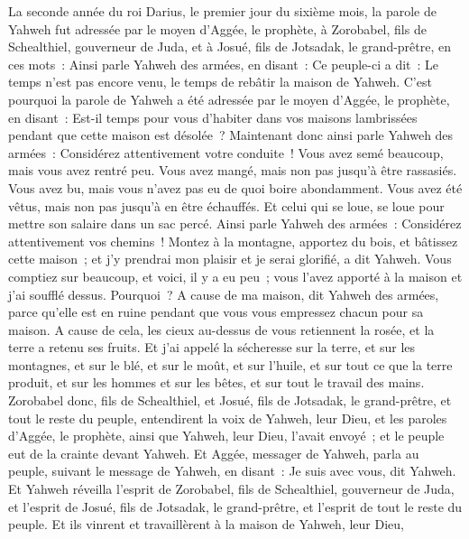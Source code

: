 \begin{multicols}{2}
\VerseOne{}La seconde année du roi Darius, le premier jour du sixième mois, la parole de Yahweh fut adressée par le moyen d'Aggée, le prophète, à Zorobabel, fils de Schealthiel, gouverneur de Juda, et à Josué, fils de Jotsadak, le grand-prêtre, en ces mots~:
Ainsi parle Yahweh des armées, en disant~: Ce peuple-ci a dit~: Le temps n'est pas encore venu, le temps de rebâtir la maison de Yahweh.
C'est pourquoi la parole de Yahweh a été adressée par le moyen d'Aggée, le prophète, en disant~:
Est-il temps pour vous d'habiter dans vos maisons lambrissées pendant que cette maison est désolée~?
Maintenant donc ainsi parle Yahweh des armées~: Considérez attentivement votre conduite~!
Vous avez semé beaucoup, mais vous avez rentré peu. Vous avez mangé, mais non pas jusqu'à être rassasiés. Vous avez bu, mais vous n'avez pas eu de quoi boire abondamment. Vous avez été vêtus, mais non pas jusqu'à en être échauffés. Et celui qui se loue, se loue pour mettre son salaire dans un sac percé.
Ainsi parle Yahweh des armées~: Considérez attentivement vos chemins~!
Montez à la montagne, apportez du bois, et bâtissez cette maison~; et j'y prendrai mon plaisir et je serai glorifié, a dit Yahweh.
Vous comptiez sur beaucoup, et voici, il y a eu peu~; vous l'avez apporté à la maison et j'ai soufflé dessus. Pourquoi~? A cause de ma maison, dit Yahweh des armées, parce qu'elle est en ruine pendant que vous vous empressez chacun pour sa maison.
A cause de cela, les cieux au-dessus de vous retiennent la rosée, et la terre a retenu ses fruits.
Et j'ai appelé la sécheresse sur la terre, et sur les montagnes, et sur le blé, et sur le moût, et sur l'huile, et sur tout ce que la terre produit, et sur les hommes et sur les bêtes, et sur tout le travail des mains.
Zorobabel donc, fils de Schealthiel, et Josué, fils de Jotsadak, le grand-prêtre, et tout le reste du peuple, entendirent la voix de Yahweh, leur Dieu, et les paroles d'Aggée, le prophète, ainsi que Yahweh, leur Dieu, l'avait envoyé~; et le peuple eut de la crainte devant Yahweh.
Et Aggée, messager de Yahweh, parla au peuple, suivant le message de Yahweh, en disant~: Je suis avec vous, dit Yahweh.
Et Yahweh réveilla l'esprit de Zorobabel, fils de Schealthiel, gouverneur de Juda, et l'esprit de Josué, fils de Jotsadak, le grand-prêtre, et l'esprit de tout le reste du peuple. Et ils vinrent et travaillèrent à la maison de Yahweh, leur Dieu,

\end{multicols}
